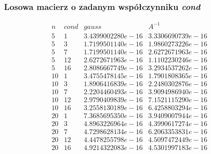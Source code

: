 \subsubsection*{Losowa macierz o zadanym współczynniku \textit{cond}}
$$
\begin{array}{c|c|c|c}
n & \textit{cond} & gauss & A^{-1}\\
\hline
5 & 1 & 3.4399002280e-16 & 3.3306690739e-16 \\
5 & 3 & 1.7199501140e-16 & 1.9860273226e-16 \\
5 & 7 & 1.7199501140e-16 & 2.6272671963e-16 \\
5 & 12 & 2.6272671963e-16 & 1.1102230246e-16 \\
5 & 16 & 2.8086667749e-16 & 3.2934537262e-16 \\
10 & 1 & 3.4755478145e-16 & 1.7901808365e-16 \\
10 & 3 & 1.8906416839e-16 & 2.2480302876e-16 \\
10 & 7 & 2.2204460493e-16 & 3.9094986940e-16 \\
10 & 12 & 2.9790409839e-16 & 7.1521115290e-16 \\
10 & 16 & 3.2558130189e-16 & 6.4258803294e-16 \\
20 & 1 & 7.3685695350e-16 & 3.9409007944e-16 \\
20 & 3 & 4.8963226964e-16 & 4.3990617274e-16 \\
20 & 7 & 4.7298628134e-16 & 6.2063353831e-16 \\
20 & 12 & 4.4478255798e-16 & 4.5097472449e-16 \\
20 & 16 & 4.9214322083e-16 & 4.5301997183e-16 \\
\end{array}
$$
